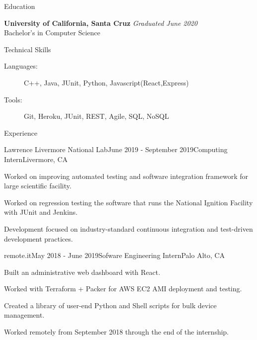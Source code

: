 \documentclass{resume} %
\begin{document}

\begin{rSection}{Education}

    {\bf University of California, Santa Cruz} \hfill {\em Graduated June 2020} \\ 
    Bachelor's in Computer Science

\end{rSection}


\begin{rSection}{Technical Skills}
    \begin{description}
    \item[Languages:] C++, Java, JUnit, Python, Javascript(React,Express)
    \item[Tools:] Git, Heroku, JUnit, REST, Agile, SQL, NoSQL
    \end{description}
\end{rSection}


\begin{rSection}{Experience}
    \begin{rSubsection}{Lawrence Livermore National Lab}{June 2019 - September 2019}{Computing Intern}{Livermore, CA}
        \item Worked on improving automated testing and software integration framework for large scientific facility.
        \item Worked on regression testing the software that runs the National Ignition Facility with JUnit and Jenkins.
        \item Development focused on industry-standard continuous integration and test-driven development practices.
    \end{rSubsection}

    \begin{rSubsection}{remote.it}{May 2018 - June 2019}{Sofware Engineering Intern}{Palo Alto, CA}
        \item Built an administrative web dashboard with React.
        \item Worked with Terraform + Packer for AWS EC2 AMI deployment and testing.
        \item Created a library of user-end Python and Shell scripts for bulk device management.
        \item Worked remotely from September 2018 through the end of the internship.
    \end{rSubsection}

\end{rSection}
\end{document}
